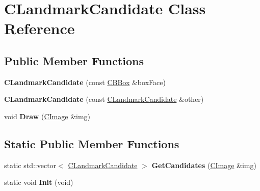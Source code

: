 \hypertarget{class_c_landmark_candidate}{}\section{C\+Landmark\+Candidate Class Reference}
\label{class_c_landmark_candidate}
\subsection*{Public Member Functions}
\begin{DoxyCompactItemize}
\item 
\mbox{\label{class_c_landmark_candidate_ad7c89dce9fd8e5bdbe805b6c76f3ef1f}} 
{\bfseries C\+Landmark\+Candidate} (const \hyperlink{class_c_b_box}{C\+B\+Box} \&box\+Face)
\item 
\mbox{\label{class_c_landmark_candidate_a00058230e636bee08a13adda9ab20325}} 
{\bfseries C\+Landmark\+Candidate} (const \hyperlink{class_c_landmark_candidate}{C\+Landmark\+Candidate} \&other)
\item 
\mbox{\label{class_c_landmark_candidate_ab16bfdd8190d18934fbeb9dce3fba5d7}} 
void {\bfseries Draw} (\hyperlink{class_c_image}{C\+Image} \&img)
\end{DoxyCompactItemize}
\subsection*{Static Public Member Functions}
\begin{DoxyCompactItemize}
\item 
\mbox{\label{class_c_landmark_candidate_a74e87c2e505868922652bbc44fe16817}} 
static std\+::vector$<$ \hyperlink{class_c_landmark_candidate}{C\+Landmark\+Candidate} $>$ {\bfseries Get\+Candidates} (\hyperlink{class_c_image}{C\+Image} \&img)
\item 
\mbox{\label{class_c_landmark_candidate_a4ef45ae7cdc9bf64dda58a3a633188d8}} 
static void {\bfseries Init} (void)
\end{DoxyCompactItemize}
